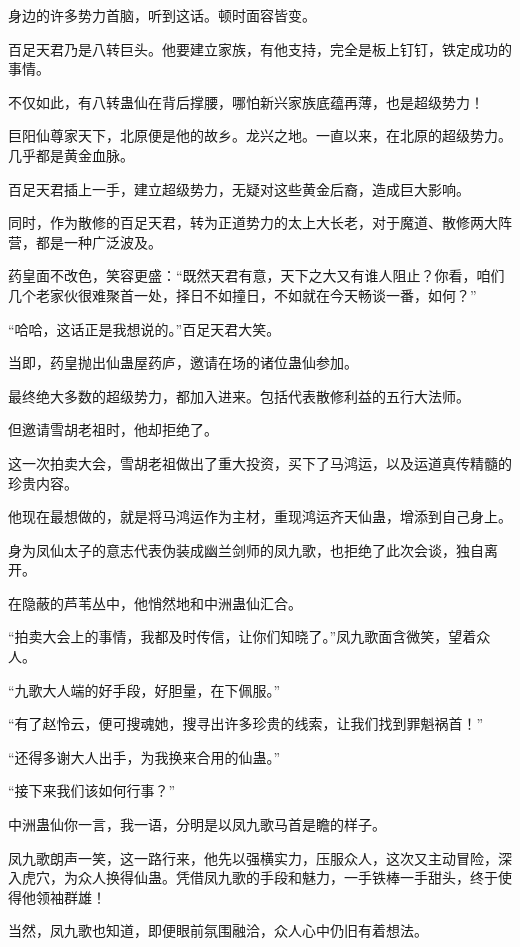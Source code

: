 \begin{this_body}
身边的许多势力首脑，听到这话。顿时面容皆变。

百足天君乃是八转巨头。他要建立家族，有他支持，完全是板上钉钉，铁定成功的事情。

不仅如此，有八转蛊仙在背后撑腰，哪怕新兴家族底蕴再薄，也是超级势力！

巨阳仙尊家天下，北原便是他的故乡。龙兴之地。一直以来，在北原的超级势力。几乎都是黄金血脉。

百足天君插上一手，建立超级势力，无疑对这些黄金后裔，造成巨大影响。

同时，作为散修的百足天君，转为正道势力的太上大长老，对于魔道、散修两大阵营，都是一种广泛波及。

药皇面不改色，笑容更盛：“既然天君有意，天下之大又有谁人阻止？你看，咱们几个老家伙很难聚首一处，择日不如撞日，不如就在今天畅谈一番，如何？”

“哈哈，这话正是我想说的。”百足天君大笑。

当即，药皇抛出仙蛊屋药庐，邀请在场的诸位蛊仙参加。

最终绝大多数的超级势力，都加入进来。包括代表散修利益的五行大法师。

但邀请雪胡老祖时，他却拒绝了。

这一次拍卖大会，雪胡老祖做出了重大投资，买下了马鸿运，以及运道真传精髓的珍贵内容。

他现在最想做的，就是将马鸿运作为主材，重现鸿运齐天仙蛊，增添到自己身上。

身为凤仙太子的意志代表伪装成幽兰剑师的凤九歌，也拒绝了此次会谈，独自离开。

在隐蔽的芦苇丛中，他悄然地和中洲蛊仙汇合。

“拍卖大会上的事情，我都及时传信，让你们知晓了。”凤九歌面含微笑，望着众人。

“九歌大人端的好手段，好胆量，在下佩服。”

“有了赵怜云，便可搜魂她，搜寻出许多珍贵的线索，让我们找到罪魁祸首！”

“还得多谢大人出手，为我换来合用的仙蛊。”

“接下来我们该如何行事？”

中洲蛊仙你一言，我一语，分明是以凤九歌马首是瞻的样子。

凤九歌朗声一笑，这一路行来，他先以强横实力，压服众人，这次又主动冒险，深入虎穴，为众人换得仙蛊。凭借凤九歌的手段和魅力，一手铁棒一手甜头，终于使得他领袖群雄！

当然，凤九歌也知道，即便眼前氛围融洽，众人心中仍旧有着想法。


\end{this_body}
